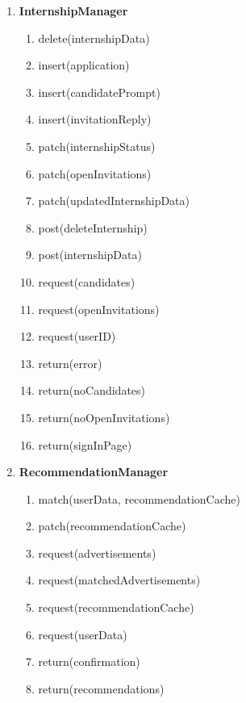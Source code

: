 \begin{enumerate}
\begin{enumerate}
    \end{enumerate}
    \item \textbf{InternshipManager}
    \begin{enumerate}
        \item delete(internshipData)
        \item insert(application)
        \item insert(candidatePrompt)
        \item insert(invitationReply)
        \item patch(internshipStatus)
        \item patch(openInvitations)
        \item patch(updatedInternshipData)
        \item post(deleteInternship)
        \item post(internshipData)
        \item request(candidates)
        \item request(openInvitations)
        \item request(userID)
        \item return(error)
        \item return(noCandidates)
        \item return(noOpenInvitations)
        \item return(signInPage)
    \end{enumerate}
    \item \textbf{RecommendationManager}
    \begin{enumerate}
        \item match(userData, recommendationCache)
        \item patch(recommendationCache)
        \item request(advertisements)
        \item request(matchedAdvertisements)
        \item request(recommendationCache)
        \item request(userData)
        \item return(confirmation)
        \item return(recommendations)


\end{enumerate}
\end{enumerate}
